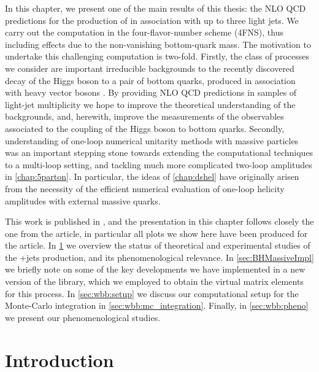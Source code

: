 In this chapter, we present one of the main results of this thesis:
the NLO QCD predictions for the production of \Wbb{} in association with up to three light jets.
We carry out the computation in the four-flavor-number scheme (4FNS), thus including effects due to the non-vanishing bottom-quark mass.
The motivation to undertake this challenging computation is two-fold.
Firstly, the class of processes we consider are important irreducible backgrounds to the recently discovered decay of the Higgs boson 
to a pair of bottom quarks, produced in association with heavy vector bosons \cite{Sirunyan:2018kst,Aaboud:2018zhk}.
By providing NLO QCD predictions in samples of light-jet multiplicity we hope to improve the theoretical 
understanding of the backgrounds, and, herewith, improve the measurements of the observables associated to 
the coupling of the Higgs boson to bottom quarks.
Secondly, understanding of one-loop numerical unitarity methods with massive particles
was an important stepping stone towards extending the computational techniques to a multi-loop setting,
and tackling much more complicated two-loop amplitudes in \cref{chap:5parton}.
In particular, the ideas of \cref{chap:dshel} have originally arisen from the necessity of the efficient
numerical evaluation of one-loop helicity amplitudes with external massive quarks.

This work is published in \cite{Anger:2017glm}, 
and the presentation in this chapter follows closely the one from the article,
in particular all plots we show here have been produced for the article.
In \cref{sec:wbb:relevance} we overview the status of theoretical and experimental studies of
the \Wbb{}+jets production, and its phenomenological relevance.
In \cref{sec:BHMassiveImpl} we briefly note on some of the
key developments we have implemented in a new version of the \BlackHat{} library,
which we employed to obtain the virtual matrix elements for this process.
In \cref{sec:wbb:setup} we discuss our computational setup for the Monte-Carlo integration
in \cref{sec:wbb:mc_integration}. Finally, in \cref{sec:wbb:pheno} we present our phenomenological studies.

\section{Introduction}
\label{sec:wbb:relevance}

